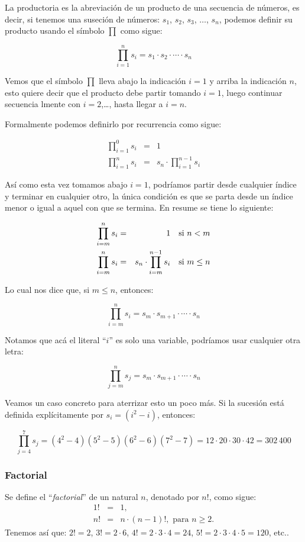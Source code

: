 La productoria es la abreviación de un producto de una secuencia de números, es decir, si tenemos una suseción de números: $s_1$, $s_2$, $s_3$, $\dots$, $s_n$, podemos definir su producto usando el símbolo $\prod$ como sigue:

\[ \prod_{i=1}^n s_i= s_1\cdot s_2\cdot \cdots \cdot s_n\]

Vemos que el símbolo $\prod$ lleva abajo la indicación $i=1$ y arriba la indicación $n$, esto quiere decir que el producto debe partir tomando $i=1$, luego continuar secuencia lmente con $i=2$,\dots, hasta llegar a $i=n$.

Formalmente podemos definirlo por recurrencia como sigue:

\begin{eqnarray*}
\prod_{i=1}^0 s_i&=&1\\
\prod_{i=1}^n s_i&=&s_n\cdot\prod_{i=1}^{n-1} s_i
\end{eqnarray*}

Así como esta vez tomamos abajo $i=1$, podríamos partir desde cualquier índice y terminar en cualquier otro, la única condición es que se parta desde un índice menor o igual a aquel con que se termina. En resume se tiene lo siguiente:

\begin{eqnarray*}
\prod_{i=m}^n s_i&=&1\quad \textup{si }n<m\\
\prod_{i=m}^n s_i&=&s_n\cdot\prod_{i=m}^{n-1} s_i \quad \textup{si }m\le n
\end{eqnarray*}

Lo cual nos dice que, si $m\le n$, entonces:

\[ \prod_{i=m}^n s_i= s_m\cdot s_{m+1}\cdot \cdots \cdot s_n\]

Notamos que acá el literal ``$i$'' es solo una variable, podríamos usar cualquier otra letra:

\[ \prod_{j=m}^n s_j= s_m\cdot s_{m+1}\cdot \cdots \cdot s_n\]

Veamos un caso concreto para aterrizar esto un poco más.
Si la sucesión está definida explícitamente por $s_i=(i^2-i)$, entonces:

\[ \prod_{j=4}^7 s_j=(4^2-4)(5^2-5)(6^2-6)(7^2-7)=12\cdot 20\cdot 30\cdot 42=302\, 400\]



\subsubsection{Factorial} Se define el ``\emph{factorial}'' de un natural $n$, denotado por $n!$, como sigue:
\begin{eqnarray*}
1!&=&1,\\
n!&=&n\cdot (n-1)!,\textrm{ para }n\ge2.
\end{eqnarray*}
Tenemos así que: $2!=2$, $3!=2\cdot6$, $4!=2\cdot3\cdot4=24$, $5!=2\cdot3\cdot4\cdot5=120$, etc..

